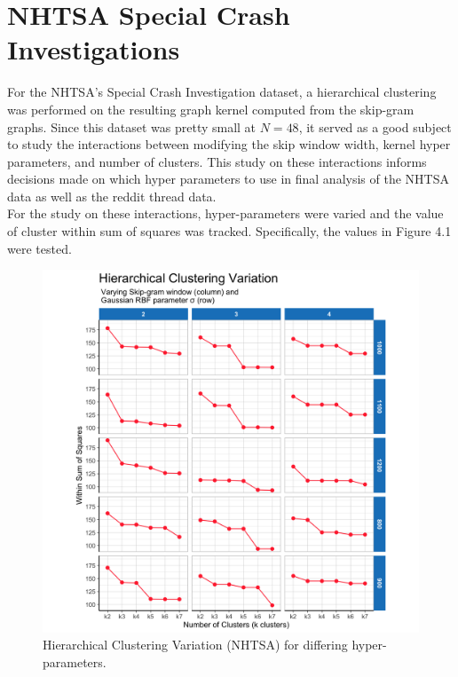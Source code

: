 %
%
%




\section{NHTSA Special Crash Investigations}
\hspace*{0.3cm} For the NHTSA's Special Crash Investigation dataset, a hierarchical clustering was performed on the resulting graph kernel computed from the skip-gram graphs. Since this dataset was pretty small at $N=48$, it served as a good subject to study the interactions between modifying the skip window width, kernel hyper parameters, and number of clusters. This study on these interactions informs decisions made on which hyper parameters to use in final analysis of the NHTSA data as well as the reddit thread data. \\
 
For the study on these interactions, hyper-parameters were varied and the value of cluster within sum of squares was tracked. Specifically, the values in Figure 4.1 were tested. \\
 

\begin{figure}
\includegraphics[width=6in]{Content/Images/hclust_variation.png}
\caption{Hierarchical Clustering Variation (NHTSA) for differing hyper-parameters.}
\end{figure}

